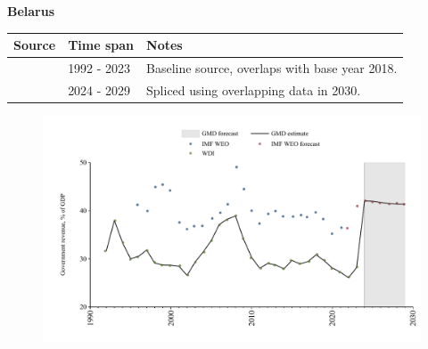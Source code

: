 \documentclass[12pt,a4paper,landscape]{article}
\begin{document}
\begin{adjustbox}{max totalsize={\paperwidth}{\paperheight},center}
\begin{minipage}[t][\textheight][t]{\textwidth}
\vspace*{0.5cm}
{}
\begin{center}
{\Large\bfseries Belarus}
\end{center}
\vspace{0.5cm}
\begin{table}[H]
\centering
\small
\begin{tabular}{|l|l|l|}
\hline
\textbf{Source} & \textbf{Time span} & \textbf{Notes} \\
\hline
\rowcolor{white}\cite{WDI}& 1992 - 2023 &Baseline source, overlaps with base year 2018.\\
\rowcolor{lightgray}\cite{IMF_WEO_forecast}& 2024 - 2029 &Spliced using overlapping data in 2030.\\
\hline
\end{tabular}
\end{table}
\begin{figure}[H]
\centering
\includegraphics[width=\textwidth,height=0.6\textheight,keepaspectratio]{graphs/BLR_govrev_GDP.pdf}
\end{figure}
\end{minipage}
\end{adjustbox}
\end{document}
